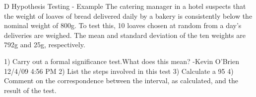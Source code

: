 D Hypothesis Testing - Example
The catering manager in a hotel suspects that the weight of loaves of bread delivered
daily by a bakery is consistently below the nominal weight of 800g. To test this,
10 loaves chosen at random from a day’s deliveries are weighed. The mean and
standard deviation of the ten weights are 792g and 25g, respectively.
 
1) Carry out a formal significance test.What does this mean? -Kevin O'Brien 12/4/09 4:56 PM 
2) List the steps involved in this test 
3) Calculate a 95%
4) Comment on the correspondence between the interval, as calculated, and the
    result of the test.
